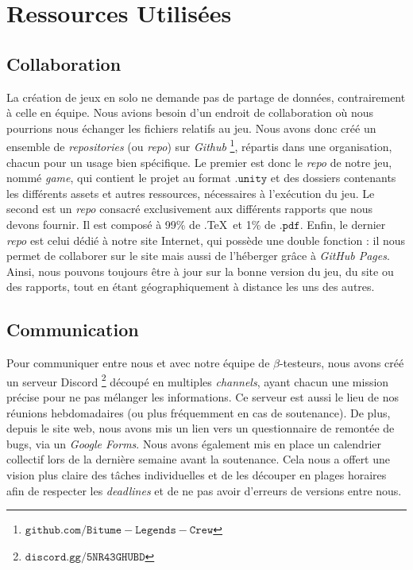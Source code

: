 \documentclass[12pt,a4paper]{article}
\begin{document}
\section{Ressources Utilisées}
    \subsection{Collaboration}
        La création de jeux en solo ne demande pas de partage de données, contrairement 
        à celle en équipe. Nous avions besoin d'un endroit de collaboration où nous 
        pourrions nous échanger les fichiers relatifs au jeu. 
        Nous avons donc créé un ensemble de \textit{repositories} (ou \textit{repo}) sur \textsl{Github}
        \footnote{\(\mathtt{github.com/Bitume-Legends-Crew}\)}, répartis dans une organisation,
        chacun pour un usage bien spécifique. Le premier est donc le \textit{repo} de
        notre jeu, nommé \textit{game}, qui contient le projet au format \(\mathtt{.unity}\)
        et des dossiers contenants les différents assets et autres ressources,
        nécessaires à l'exécution du jeu. 
        Le second est un \textit{repo} consacré exclusivement aux différents rapports 
        que nous devons fournir. Il est composé à 99\% de .\TeX\, et 1\% de \(\mathtt{.pdf}\).
        Enfin, le dernier \textit{repo} est celui dédié à notre site Internet, qui
        possède une double fonction : il nous permet de collaborer sur le site
        mais aussi de l'héberger grâce à \textsl{GitHub Pages}.\\
        \indent Ainsi, nous pouvons toujours être à jour sur la bonne version du jeu,
        du site ou des rapports, tout en étant géographiquement à distance les uns 
        des autres.

    \subsection{Communication}
        Pour communiquer entre nous et avec notre équipe de \(\beta\)-testeurs, nous
        avons créé un serveur Discord \footnote{\(\mathtt{discord.gg/5NR43GHUBD}\)}
        découpé en multiples 
        \textit{channels}, ayant chacun une mission précise pour ne pas mélanger les
        informations. Ce serveur est aussi le lieu de nos réunions hebdomadaires 
        (ou plus fréquemment en cas de soutenance). De plus, depuis le site web, nous
        avons mis un lien vers un questionnaire de remontée de bugs, via un \textsl{Google Forms}.
        Nous avons également mis en place un calendrier collectif lors de la
        dernière semaine avant la soutenance. Cela nous a offert une vision plus
        claire des tâches individuelles et de les découper en plages horaires afin de 
        respecter les \textit{deadlines} et de ne pas avoir d'erreurs de versions
        entre nous.
\end{document}
